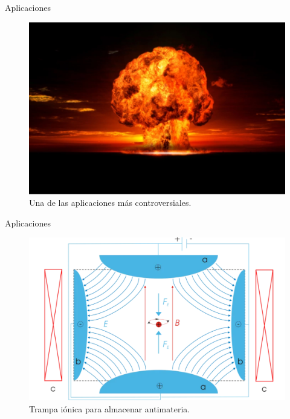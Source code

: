 \documentclass{beamer}
\begin{document}
\begin{frame}{Aplicaciones}
\begin{figure}
    \centering
    \includegraphics[scale=.4]{bomba.png}
    \caption{Una de las aplicaciones más controversiales.}
    \label{fig:my_label}
\end{figure}

\end{frame}

\begin{frame}{Aplicaciones}
\begin{figure}
    \centering
    \includegraphics[scale=.4]{ion.png}
    \caption{Trampa iónica para almacenar antimateria.}
    \label{fig:my_label}
\end{figure}
    
\end{frame}
\end{document}
